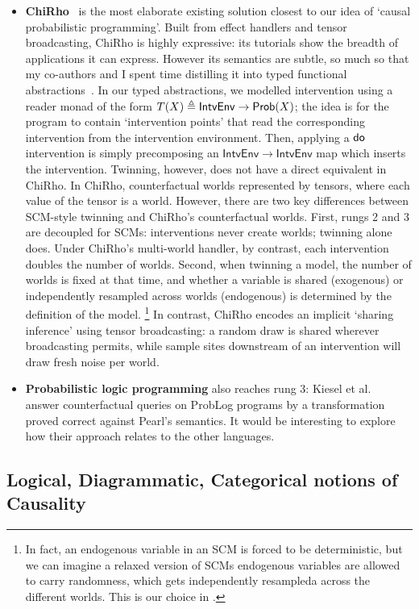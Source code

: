 \documentclass[11pt,a4paper]{article}
\begin{document}
\begin{itemize}
    \item \textbf{ChiRho}~\cite{chirho,tutorialchirho} is the most elaborate existing solution closest to our idea of `causal probabilistic programming'. Built from effect handlers and tensor broadcasting, ChiRho is highly expressive: its tutorials \cite{tutorialchirho} show the breadth of applications it can express. However its semantics are subtle, so much so that my co-authors and I spent time distilling it into typed functional abstractions~\cite{lafi-wang}. In our typed abstractions, we modelled intervention using a reader monad of the form $T(X) \triangleq \mathsf{IntvEnv} \to \mathsf{Prob}(X)$; the idea is for the program to contain `intervention points' that read the corresponding intervention from the intervention environment. Then, applying a $\mathsf{do}$ intervention is simply precomposing an $\mathsf{IntvEnv} \to \mathsf{IntvEnv}$ map which inserts the intervention. Twinning, however, does not have a direct equivalent in ChiRho. In ChiRho, counterfactual worlds represented by tensors, where each value of the tensor is a world. However, there are two key differences between SCM-style twinning and ChiRho's counterfactual worlds. First, rungs 2 and 3 are decoupled for SCMs: interventions never create worlds; twinning alone does. Under ChiRho's multi-world handler, by contrast, each intervention doubles the number of worlds. Second, when twinning a model, the number of worlds is fixed at that time, and whether a variable is shared (exogenous) or independently resampled across worlds (endogenous) is determined by the definition of the model. \footnote{In fact, an endogenous variable in an SCM is forced to be deterministic, but we can imagine a relaxed version of SCMs endogenous variables are allowed to carry randomness, which gets independently resampleda across the different worlds. This is our choice in \cite{wang2026causalppl}.} In contrast, ChiRho encodes an implicit `sharing inference' using tensor broadcasting: a random draw is shared wherever broadcasting permits, while sample sites downstream of an intervention will draw fresh noise per world. 
    \item \textbf{Probabilistic logic programming} also reaches rung 3: Kiesel et al.~\cite{kiesel2023whatif} answer counterfactual queries on ProbLog programs by a transformation proved correct against Pearl's semantics. It would be interesting to explore how their approach relates to the other languages. 
\end{itemize}

\subsection{Logical, Diagrammatic, Categorical notions of Causality}\label{sec:othernotions}
\end{document}
